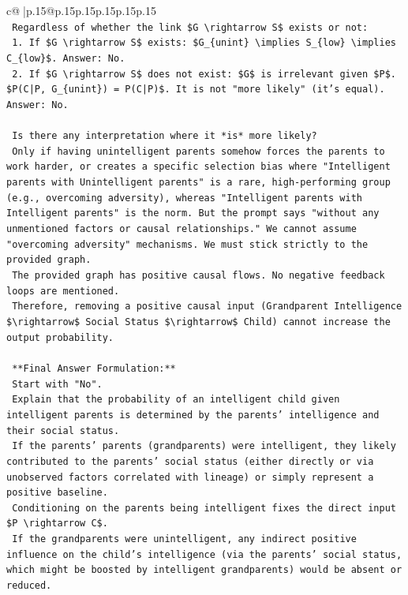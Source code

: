 \documentclass{article}
\begin{document}
{\begin{supertabular}{c@{$\;$}|p{.15\linewidth}@{}p{.15\linewidth}p{.15\linewidth}p{.15\linewidth}p{.15\linewidth}p{.15\linewidth}}
{{{\\ 
\texttt{    Regardless of whether the link \$G \textbackslash{}rightarrow S\$ exists or not:} \\
\texttt{    1. If \$G \textbackslash{}rightarrow S\$ exists: \$G\_\{unint\} \textbackslash{}implies S\_\{low\} \textbackslash{}implies C\_\{low\}\$. Answer: No.} \\
\texttt{    2. If \$G \textbackslash{}rightarrow S\$ does not exist: \$G\$ is irrelevant given \$P\$. \$P(C|P, G\_\{unint\}) = P(C|P)\$. It is not "more likely" (it's equal). Answer: No.} \\
\\ 
\texttt{    Is there any interpretation where it *is* more likely?} \\
\texttt{    Only if having unintelligent parents somehow forces the parents to work harder, or creates a specific selection bias where "Intelligent parents with Unintelligent parents" is a rare, high{-}performing group (e.g., overcoming adversity), whereas "Intelligent parents with Intelligent parents" is the norm. But the prompt says "without any unmentioned factors or causal relationships." We cannot assume "overcoming adversity" mechanisms. We must stick strictly to the provided graph.} \\
\texttt{    The provided graph has positive causal flows. No negative feedback loops are mentioned.} \\
\texttt{    Therefore, removing a positive causal input (Grandparent Intelligence \$\textbackslash{}rightarrow\$ Social Status \$\textbackslash{}rightarrow\$ Child) cannot increase the output probability.} \\
\\ 
\texttt{    **Final Answer Formulation:**} \\
\texttt{    Start with "No".} \\
\texttt{    Explain that the probability of an intelligent child given intelligent parents is determined by the parents' intelligence and their social status.} \\
\texttt{    If the parents' parents (grandparents) were intelligent, they likely contributed to the parents' social status (either directly or via unobserved factors correlated with lineage) or simply represent a positive baseline.} \\
\texttt{    Conditioning on the parents being intelligent fixes the direct input \$P \textbackslash{}rightarrow C\$.} \\
\texttt{    If the grandparents were unintelligent, any indirect positive influence on the child's intelligence (via the parents' social status, which might be boosted by intelligent grandparents) would be absent or reduced.} \\
}}}
\end{supertabular}}
\end{document}
